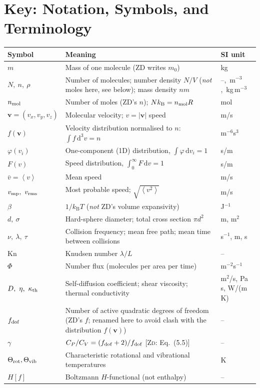 \documentclass[11pt,a4paper]{report}
\theoremstyle{definition}
\theoremstyle{plain}
\newcommand{\ZD}[1]{[\textsc{Zd}: #1]}   %
\newcommand{\kB}{k_{\mathrm{B}}}
\newcommand{\dd}{\mathrm{d}}
\newcommand{\avg}[1]{\left\langle #1\right\rangle}
\newcommand{\vv}{\mathbf{v}}
\newcommand{\vbar}{\bar{v}}
\begin{document}
\chapter*{Key: Notation, Symbols, and Terminology}

\begin{center}
\small
\begin{tabular}{@{}p{2.2cm}p{8.6cm}p{2.6cm}@{}}
\toprule
Symbol & Meaning & SI unit\\
\midrule
$m$ & Mass of one molecule (ZD writes $m_0$) & kg\\
$N,\ n,\ \rho$ & Number of molecules; number density $N/V$ (\emph{not} moles here, see below); mass density $nm$ & --,\ m$^{-3}$,\ kg\,m$^{-3}$\\
$n_{\rm mol}$ & Number of moles (ZD's $n$); $N\kB=n_{\rm mol}R$ & mol\\
$\vv=(v_x,v_y,v_z)$ & Molecular velocity; $v=|\vv|$ speed & m/s\\
$f(\vv)$ & Velocity distribution normalised to $n$: $\int f\,\dd^3v=n$ & m$^{-6}$s$^3$\\
$\varphi(v_i)$ & One-component (1D) distribution, $\int\varphi\,\dd v_i=1$ & s/m\\
$F(v)$ & Speed distribution, $\int_0^\infty F\,\dd v=1$ & s/m\\
$\vbar=\avg{v}$ & Mean speed & m/s\\
$v_{\rm mp},\ v_{\rm rms}$ & Most probable speed; $\sqrt{\avg{v^2}}$ & m/s\\
$\beta$ & $1/\kB T$ (\emph{not} ZD's volume expansivity) & J$^{-1}$\\
$d,\ \sigma$ & Hard-sphere diameter; total cross section $\pi d^2$ & m, m$^2$\\
$\nu,\ \lambda,\ \tau$ & Collision frequency; mean free path; mean time between collisions & s$^{-1}$, m, s\\
$\mathrm{Kn}$ & Knudsen number $\lambda/L$ & --\\
$\Phi$ & Number flux (molecules per area per time) & m$^{-2}$s$^{-1}$\\
$D,\ \eta,\ \kappa_{\rm th}$ & Self-diffusion coefficient; shear viscosity; thermal conductivity & m$^2$/s, Pa\,s, W/(m\,K)\\
$f_{\rm dof}$ & Number of active quadratic degrees of freedom (ZD's $f$; renamed here to avoid clash with the distribution $f(\vv)$) & --\\
$\gamma$ & $C_P/C_V=(f_{\rm dof}+2)/f_{\rm dof}$ \ZD{Eq.~(5.5)} & --\\
$\Theta_{\rm rot},\Theta_{\rm vib}$ & Characteristic rotational and vibrational temperatures & K\\
$H[f]$ & Boltzmann $H$-functional (not enthalpy) & --\\
\bottomrule
\end{tabular}
\end{center}
\end{document}
